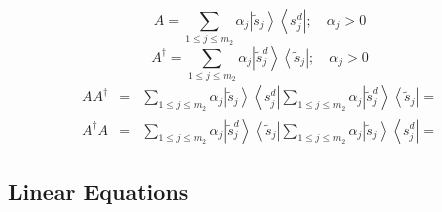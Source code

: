 \begin{equation}
A=\sum_{1\leq j\leq m_{2}}\alpha _{j}\left\vert \tilde{s}_{j}\right\rangle
\left\langle s_{j}^{d}\right\vert ;\quad \alpha _{j}>0
\end{equation}%
\begin{equation}
A^{\dagger }=\sum_{1\leq j\leq m_{2}}\alpha _{j}\left\vert \tilde{s}%
_{j}^{d}\right\rangle \left\langle \tilde{s}_{j}\right\vert ;\quad \alpha
_{j}>0
\end{equation}%
\begin{eqnarray*}
AA^{\dagger } &=&\sum_{1\leq j\leq m_{2}}\alpha _{j}\left\vert \tilde{s}%
_{j}\right\rangle \left\langle s_{j}^{d}\right\vert \sum_{1\leq j\leq
m_{2}}\alpha _{j}\left\vert \tilde{s}_{j}^{d}\right\rangle \left\langle 
\tilde{s}_{j}\right\vert = \\
A^{\dagger }A &=&\sum_{1\leq j\leq m_{2}}\alpha _{j}\left\vert \tilde{s}%
_{j}^{d}\right\rangle \left\langle \tilde{s}_{j}\right\vert \sum_{1\leq
j\leq m_{2}}\alpha _{j}\left\vert \tilde{s}_{j}\right\rangle \left\langle
s_{j}^{d}\right\vert =
\end{eqnarray*}

\subsection{Linear Equations}

